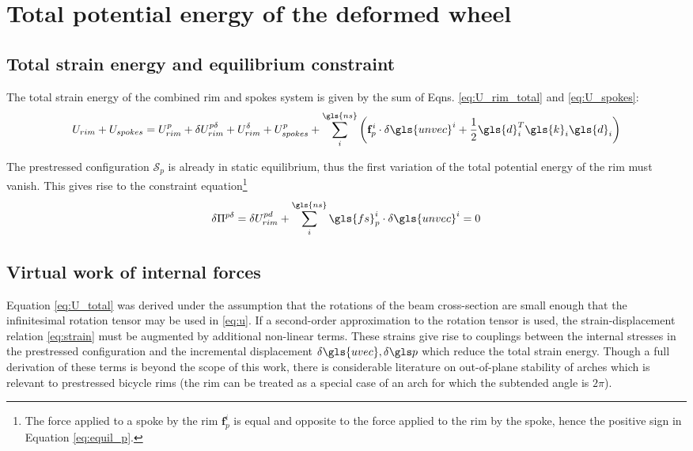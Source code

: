 \documentclass[\rootdir/thesis.tex]{subfiles}
\begin{document}
\section{Total potential energy of the deformed wheel}

\subsection{Total strain energy and equilibrium constraint}

The total strain energy of the combined rim and spokes system is given by the sum of Eqns. \eqref{eq:U_rim_total} and \eqref{eq:U_spokes}:
\begin{equation}
\label{eq:U_total}
U_{rim} + U_{spokes} = U_{rim}^p + \delta U_{rim}^{p\delta} + U_{rim}^{\delta} + 
	U_{spokes}^p + \sum_i^{\gls{ns}} \left(\mathbf{f}_p^i \cdot \delta\gls{unvec}^i +
    \frac{1}{2}\gls{d}_i^T \gls{k}_i \gls{d}_i\right)
\end{equation}

The prestressed configuration $\mathcal{S}_p$ is already in static equilibrium, thus the first variation of the total potential energy of the rim must vanish. This gives rise to the constraint equation\footnote{The force applied to a spoke by the rim $\mathbf{f}_p^i$ is equal and opposite to the force applied to the rim by the spoke, hence the positive sign in Equation \eqref{eq:equil_p}.}
\begin{equation}
\label{eq:equil_p}
\delta\Pi^{p\delta} = \delta U_{rim}^{pd} + \sum_i^{\gls{ns}} \gls{fs}_p^i \cdot \delta\gls{unvec}^i = 0
\end{equation}


\subsection{Virtual work of internal forces}

Equation \eqref{eq:U_total} was derived under the assumption that the rotations of the beam cross-section are small enough that the infinitesimal rotation tensor may be used in \eqref{eq:u}. If a second-order approximation to the rotation tensor is used, the strain-displacement relation \eqref{eq:strain} must be augmented by additional non-linear terms. These strains give rise to couplings between the internal stresses in the prestressed configuration and the incremental displacement $\delta\gls{uvec}, \delta\p$ which reduce the total strain energy. Though a full derivation of these terms is beyond the scope of this work, there is considerable literature on out-of-plane stability of arches which is relevant to prestressed bicycle rims (the rim can be treated as a special case of an arch for which the subtended angle is $2\pi$).
\end{document}
